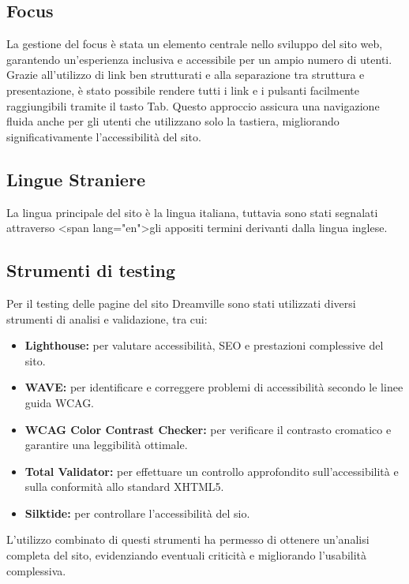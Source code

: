 \subsection{Focus}
La gestione del focus è stata un elemento centrale nello sviluppo del sito web, garantendo un’esperienza inclusiva e accessibile per un ampio numero di utenti. Grazie all’utilizzo di link ben strutturati e alla separazione tra struttura e presentazione, è stato possibile rendere tutti i link e i pulsanti facilmente raggiungibili tramite il tasto Tab. Questo approccio assicura una navigazione fluida anche per gli utenti che utilizzano solo la tastiera, migliorando significativamente l’accessibilità del sito.
\subsection{Lingue Straniere}
La lingua principale del sito è la lingua italiana, tuttavia sono stati segnalati attraverso \textless span lang="en"\textgreater gli appositi termini derivanti dalla lingua inglese.
\subsection{Strumenti di testing}
Per il testing delle pagine del sito Dreamville sono stati utilizzati diversi strumenti di analisi e validazione, tra cui:
\begin{itemize}
    \item \textbf{Lighthouse:} per valutare accessibilità, SEO e prestazioni complessive del sito.
    \item \textbf{WAVE:} per identificare e correggere problemi di accessibilità secondo le linee guida WCAG.
    \item \textbf{WCAG Color Contrast Checker:} per verificare il contrasto cromatico e garantire una leggibilità ottimale.
    \item \textbf{Total Validator:} per effettuare un controllo approfondito sull'accessibilità e sulla conformità allo standard XHTML5.
    \item \textbf{Silktide:} per controllare l'accessibilità del sio.
\end{itemize}

L'utilizzo combinato di questi strumenti ha permesso di ottenere un'analisi completa del sito, evidenziando eventuali criticità e migliorando l'usabilità complessiva.
